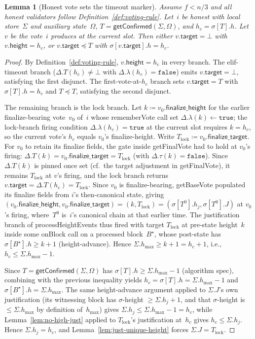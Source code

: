 \ifx\litemode\undefined\documentclass{article}\fi
\newcommand{\target}{\mathsf{target}}
\newcommand{\height}{\mathsf{height}}
\newcommand{\finalizeHeight}{\mathsf{finalize\_height}}
\newcommand{\finalizeTarget}{\mathsf{finalize\_target}}
\newcommand{\hmax}{\ensuremath{h_{\max}}\xspace}
\newcommand{\processHeightEvents}{\textsf{processHeightEvents}\xspace}
\newcommand{\getBaseVote}{\textsf{getBaseVote}\xspace}
\newcommand{\getFinalVote}{\textsf{getFinalVote}\xspace}
\newcommand{\rememberVote}{\textsf{rememberVote}\xspace}
\newcommand{\onBlock}{\textsf{onBlock}\xspace}
\newcommand{\getConfirmed}{\textsf{getConfirmed}\xspace}
\theoremstyle{plain}
\newtheorem{lemma}{Lemma}
\theoremstyle{definition}
\theoremstyle{remark}
\begin{document}
\begin{lemma}[Honest vote sets the timeout marker]\label{lem:honest-vote-sets-timeout}
Assume $f < n/3$ and all honest validators follow Definition~\ref{def:voting-rule}.
Let~$i$ be honest with local store~$\Sigma$ and auxiliary state~$\Omega$, $T = \getConfirmed(\Sigma, \Omega)$, and $h_c = \sigma[T].h$.
Let~$v$ be the vote~$i$ produces at the current slot.
Then either $v.\target = \bot$ with $v.\height = h_c$, or $v.\target \preceq T$ with $\sigma[v.\target].h = h_c$.
\end{lemma}

\begin{proof}
By Definition~\ref{def:voting-rule}, $v.\height = h_c$ in every branch.
The elif-timeout branch ($\Delta.T(h_c) \neq \bot$ with $\Delta.\lambda(h_c) = \mathtt{false}$) emits $v.\target = \bot$, satisfying the first disjunct.
The first-vote-at-$h_c$ branch sets $v.\target = T$ with $\sigma[T].h = h_c$ and $T \preceq T$, satisfying the second disjunct.

The remaining branch is the lock branch.
Let $k \coloneqq v_0.\finalizeHeight$ for the earlier finalize-bearing vote~$v_0$ of~$i$ whose \rememberVote call set $\Delta.\lambda(k) \gets \mathtt{true}$; the lock-branch firing condition $\Delta.\lambda(h_c) = \mathtt{true}$ at the current slot requires $k = h_c$, so the current vote's $h_c$ equals $v_0$'s finalize-height.
Write $T_{\mathrm{lock}} \coloneqq v_0.\finalizeTarget$.
For $v_0$ to retain its finalize fields, the gate inside \getFinalVote had to hold at $v_0$'s firing: $\Delta.T(k) = v_0.\finalizeTarget = T_{\mathrm{lock}}$ (with $\Delta.\tau(k) = \mathtt{false}$).
Since $\Delta.T(k)$ is pinned once set (cf.\ the target adjustment in \getFinalVote), it remains $T_{\mathrm{lock}}$ at $v$'s firing, and the lock branch returns $v.\target = \Delta.T(h_c) = T_{\mathrm{lock}}$.
Since $v_0$ is finalize-bearing, \getBaseVote populated its finalize fields from $i$'s then-canonical state, giving $(v_0.\finalizeHeight, v_0.\finalizeTarget) = (k, T_{\mathrm{lock}}) = (\sigma[T^0].h_j, \sigma[T^0].J)$ at $v_0$'s firing, where~$T^0$ is~$i$'s canonical chain at that earlier time.
The justification branch of \processHeightEvents thus fired with target $T_{\mathrm{lock}}$ at pre-state height~$k$ inside some \onBlock call on a processed block~$B^\star$, whose post-state has $\sigma[B^\star].h \geq k + 1$ (height-advance).
Hence $\Sigma.\hmax \geq k + 1 = h_c + 1$, i.e., $h_c \leq \Sigma.\hmax - 1$.

Since $T = \getConfirmed(\Sigma, \Omega)$ has $\sigma[T].h \geq \Sigma.\hmax - 1$ (algorithm spec), combining with the previous inequality yields $h_c = \sigma[T].h = \Sigma.\hmax - 1$ and $\sigma[B^\star].h = \Sigma.\hmax$.
The same height-advance argument applied to $\Sigma.J$'s own justification (its witnessing block has $\sigma$-height $\geq \Sigma.h_j + 1$, and that $\sigma$-height is $\leq \Sigma.\hmax$ by definition of~$\hmax$) gives $\Sigma.h_j \leq \Sigma.\hmax - 1 = h_c$, while Lemma~\ref{lem:no-high-just} applied to $T_{\mathrm{lock}}$'s justification at~$h_c$ gives $h_c \leq \Sigma.h_j$.
Hence $\Sigma.h_j = h_c$, and Lemma~\ref{lem:just-unique-height} forces $\Sigma.J = T_{\mathrm{lock}}$.


\end{proof}
\end{document}
